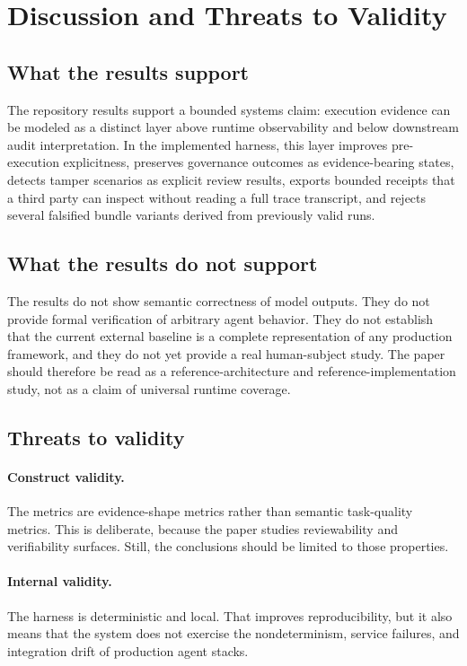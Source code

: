 \section{Discussion and Threats to Validity}
\label{sec:discussion}

\subsection{What the results support}

The repository results support a bounded systems claim: execution evidence can be modeled as a distinct layer above runtime observability and below downstream audit interpretation. In the implemented harness, this layer improves pre-execution explicitness, preserves governance outcomes as evidence-bearing states, detects tamper scenarios as explicit review results, exports bounded receipts that a third party can inspect without reading a full trace transcript, and rejects several falsified bundle variants derived from previously valid runs.

\subsection{What the results do not support}

The results do not show semantic correctness of model outputs. They do not provide formal verification of arbitrary agent behavior. They do not establish that the current external baseline is a complete representation of any production framework, and they do not yet provide a real human-subject study. The paper should therefore be read as a reference-architecture and reference-implementation study, not as a claim of universal runtime coverage.

\subsection{Threats to validity}

\paragraph{Construct validity.}
The metrics are evidence-shape metrics rather than semantic task-quality metrics. This is deliberate, because the paper studies reviewability and verifiability surfaces. Still, the conclusions should be limited to those properties.

\paragraph{Internal validity.}
The harness is deterministic and local. That improves reproducibility, but it also means that the system does not exercise the nondeterminism, service failures, and integration drift of production agent stacks.

